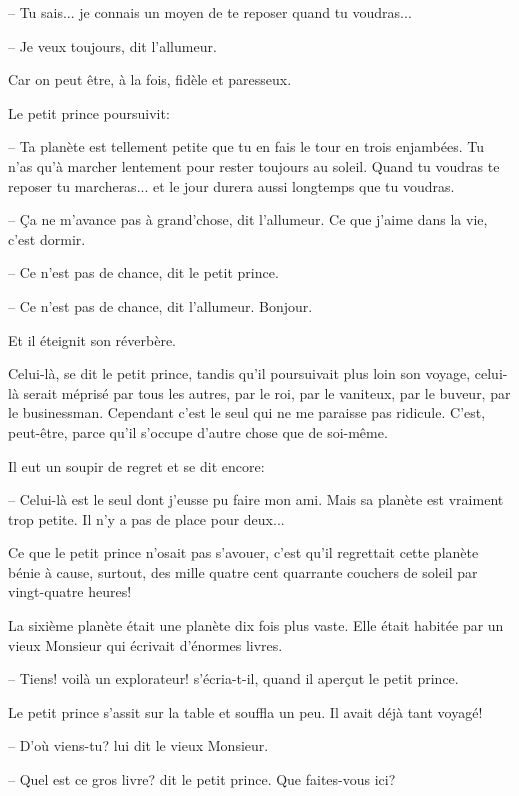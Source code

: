 \documentclass[a4paper]{report}
\begin{document}
-- Tu sais... je connais un moyen de te reposer quand tu voudras...

-- Je veux toujours, dit l'allumeur.

Car on peut être, à la fois, fidèle et paresseux.

Le petit prince poursuivit:

-- Ta planète est tellement petite que tu en fais le tour en trois enjambées. Tu n'as qu'à marcher lentement pour rester toujours au soleil. Quand tu voudras te reposer tu marcheras... et le jour durera aussi longtemps que tu voudras.

-- Ça ne m'avance pas à grand'chose, dit l'allumeur. Ce que j'aime dans la vie, c'est dormir.

-- Ce n'est pas de chance, dit le petit prince.

-- Ce n'est pas de chance, dit l'allumeur. Bonjour.

Et il éteignit son réverbère.

Celui-là, se dit le petit prince, tandis qu'il poursuivait plus loin son voyage, celui-là serait méprisé par tous les autres, par le roi, par le vaniteux, par le buveur, par le businessman. Cependant c'est le seul qui ne me paraisse pas ridicule. C'est, peut-être, parce qu'il s'occupe d'autre chose que de soi-même.

Il eut un soupir de regret et se dit encore:

-- Celui-là est le seul dont j'eusse pu faire mon ami. Mais sa planète est vraiment trop petite. Il n'y a pas de place pour deux...

Ce que le petit prince n'osait pas s'avouer, c'est qu'il regrettait cette planète bénie à cause, surtout, des mille quatre cent quarrante couchers de soleil par vingt-quatre heures!
\parachapter[XV]{} %

La sixième planète était une planète dix fois plus vaste. Elle était habitée par un vieux Monsieur qui écrivait d'énormes livres.

-- Tiens! voilà un explorateur! s'écria-t-il, quand il aperçut le petit prince.

Le petit prince s'assit sur la table et souffla un peu. Il avait déjà tant voyagé!


-- D'où viens-tu? lui dit le vieux Monsieur.

-- Quel est ce gros livre? dit le petit prince. Que faites-vous ici?
\end{document}
